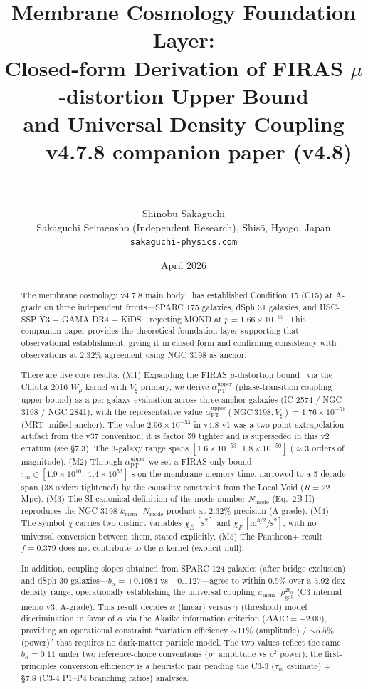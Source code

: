 \documentclass[11pt,a4paper]{article}
\title{\bfseries Membrane Cosmology Foundation Layer:\\
Closed-form Derivation of FIRAS $\mu$-distortion Upper Bound\\
and Universal Density Coupling\\[4pt]
\large --- v4.7.8 companion paper (v4.8) ---}
\author{Shinobu Sakaguchi\\[2pt]
\small Sakaguchi Seimensho (Independent Research), Shis\={o}, Hyogo, Japan\\
\small \texttt{sakaguchi-physics.com}}
\date{April 2026}
\newcommand{\kmem}{k_{\mathrm{mem}}}
\newcommand{\Vxi}{V_{\xi}}
\newcommand{\Nmode}{N_{\mathrm{mode}}}
\newcommand{\aPT}{\alpha_{\mathrm{PT}}}
\newcommand{\taum}{\tau_{m}}
\newcommand{\bal}{b_{\alpha}}
\newcommand{\umem}{u_{\mathrm{mem}}}
\newcommand{\rhogal}{\rho_{\mathrm{gal}}}
\newcommand{\Wmu}{W_{\mu}}
\newcommand{\AIC}{\Delta\mathrm{AIC}}
\begin{document}
\maketitle
\thispagestyle{empty}

\begin{abstract}
\small\noindent
The membrane cosmology v4.7.8 main body~\citep{Sakaguchi2026a} has established Condition 15 (C15)
at A-grade on three independent fronts---SPARC 175 galaxies, dSph 31 galaxies, and HSC-SSP Y3 +
GAMA DR4 + KiDS---rejecting MOND at $p = 1.66 \times 10^{-53}$. This companion paper provides the
theoretical foundation layer supporting that observational establishment, giving it in closed form
and confirming consistency with observations at 2.32\% agreement using NGC 3198 as anchor.

\smallskip\noindent
There are five core results:
(M1) Expanding the FIRAS $\mu$-distortion bound~\citep{Fixsen1996} via the Chluba 2016 $\Wmu$
kernel with $\Vxi$ primary, we derive
$\aPT^{\mathrm{upper}}$ (phase-transition coupling upper bound) as a per-galaxy evaluation across
three anchor galaxies (IC 2574 / NGC 3198 / NGC 2841), with the representative value
$\aPT^{\mathrm{upper}}(\mathrm{NGC\,3198}, \Vxi) = 1.76 \times 10^{-51}$ (MRT-unified anchor).
The value $2.96 \times 10^{-53}$ in v4.8 v1 was a two-point extrapolation artifact from the v37
convention; it is factor 59 tighter and is superseded in this v2 erratum (see \S 7.3).
The 3-galaxy range spans $[1.6 \times 10^{-53},\, 1.8 \times 10^{-50}]$ ($\approx$3 orders of magnitude).
(M2) Through $\aPT^{\mathrm{upper}}$ we set a FIRAS-only bound
$\taum \in [1.9 \times 10^{10},\; 1.4 \times 10^{53}]$ s on the membrane memory time,
narrowed to a 5-decade span (38 orders tightened) by the causality constraint from the Local Void
($R = 22$ Mpc).
(M3) The SI canonical definition of the mode number $\Nmode$ (Eq.~2B-II) reproduces the NGC 3198
$\kmem \cdot \Nmode$ product at 2.32\% precision (A-grade).
(M4) The symbol $\chi$ carries two distinct variables
$\chi_E\,[\mathrm{s}^2]$ and $\chi_F\,[\mathrm{m}^{3/2}/\mathrm{s}^2]$, with no universal conversion
between them, stated explicitly.
(M5) The Pantheon+ result~\citep{Scolnic2022} $f = 0.379$ does not contribute to the $\mu$
kernel (explicit null).

\smallskip\noindent
In addition, coupling slopes obtained from SPARC 124 galaxies (after bridge exclusion) and dSph 30
galaxies---$\bal = +0.1084$ vs $+0.1127$---agree to within 0.5\% over a 3.92 dex density range,
operationally establishing the universal coupling $\umem \cdot \rhogal^{2\bal}$
(C3 internal memo v3, A-grade). This result decides $\alpha$ (linear) versus $\gamma$ (threshold)
model discrimination in favor of $\alpha$ via the Akaike information criterion
($\AIC = -2.00$), providing an operational constraint
``variation efficiency $\sim 11\%$ (amplitude) / $\sim 5.5\%$ (power)''
that requires no dark-matter particle model.
The two values reflect the same $\bal = 0.11$ under two reference-choice conventions
($\rho^1$ amplitude vs $\rho^2$ power); the first-principles conversion efficiency is a heuristic
pair pending the C3-3 ($\taum$ estimate) + \S 7.8 (C3-4 P1--P4 branching ratios) analyses.


\end{abstract}
\end{document}
